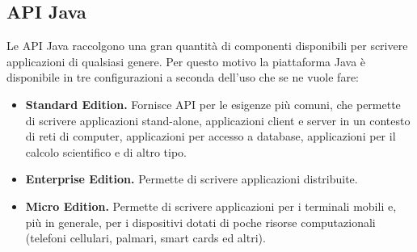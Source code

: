 \subsection*{API Java}
Le API Java raccolgono una gran quantit\`a di componenti disponibili per scrivere applicazioni di qualsiasi genere. Per questo motivo la piattaforma Java \`e disponibile in tre configurazioni a seconda dell'uso che se ne vuole fare:
\begin{itemize}
\item \textbf{Standard Edition.} Fornisce API per le esigenze pi\`u comuni, che permette di scrivere applicazioni stand-alone, applicazioni client e server in un contesto di reti di computer, applicazioni per accesso a database, applicazioni per il calcolo scientifico e di altro tipo.
\item \textbf{Enterprise Edition.} Permette di scrivere applicazioni distribuite.
\item \textbf{Micro Edition.} Permette di scrivere applicazioni per i terminali mobili e, pi\`u in generale, per i dispositivi dotati di poche risorse computazionali (telefoni cellulari, palmari, smart cards ed altri).
\end{itemize}

